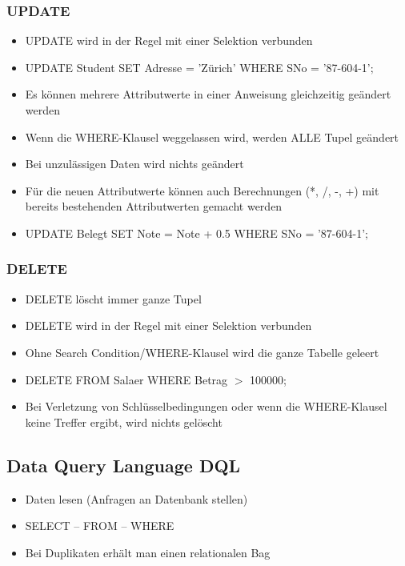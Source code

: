 \documentclass[8pt,a4paper]{scrartcl}
\begin{document}
\begin{multicols*}{3}
				\subsubsection{UPDATE}
					\begin{itemize}\itemsep0pt		
						\item UPDATE wird in der Regel mit einer Selektion verbunden
						\item UPDATE Student SET Adresse = 'Zürich' WHERE SNo = '87-604-1'$;$
						\item Es können mehrere Attributwerte in einer Anweisung gleichzeitig geändert werden
						\item Wenn die WHERE-Klausel weggelassen wird, werden ALLE Tupel geändert
						\item Bei unzulässigen Daten wird nichts geändert
						\item Für die neuen Attributwerte können auch Berechnungen (*, /, -, +) mit bereits
bestehenden Attributwerten gemacht werden
						\item UPDATE Belegt SET Note = Note + 0.5 WHERE SNo = '87-604-1'$;$
					\end{itemize}	
					
				\subsubsection{DELETE}
					\begin{itemize}\itemsep0pt		
						\item DELETE löscht immer ganze Tupel
						\item DELETE wird in der Regel mit einer Selektion verbunden
						\item Ohne Search Condition/WHERE-Klausel wird die ganze Tabelle geleert
						\item DELETE FROM Salaer WHERE Betrag $>$ 100000;
						\item Bei Verletzung von Schlüsselbedingungen oder wenn die WHERE-Klausel
keine Treffer ergibt, wird nichts gelöscht
					\end{itemize}	
				
			\subsection{Data Query Language DQL}
				\begin{itemize}\itemsep0pt		
					\item Daten lesen (Anfragen an Datenbank stellen)
					\item SELECT – FROM – WHERE
					\item Bei Duplikaten erhält man einen relationalen Bag
				\end{itemize}			
				

\end{multicols*}
\end{document}
